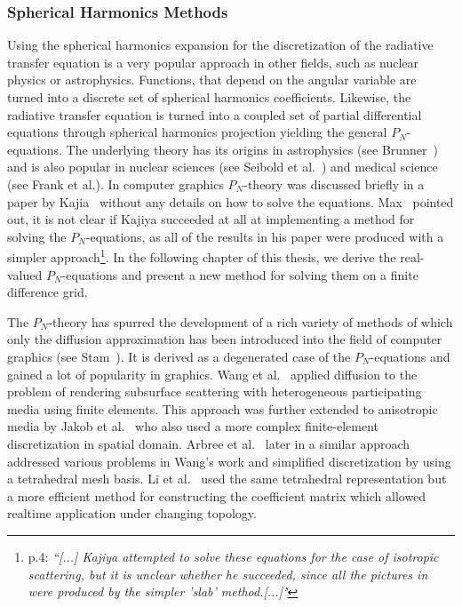 \subsubsection*{Spherical Harmonics Methods}
Using the spherical harmonics expansion for the discretization of the radiative transfer equation is a very popular approach in other fields, such as nuclear physics or astrophysics. Functions, that depend on the angular variable are turned into a discrete set of spherical harmonics coefficients. Likewise, the radiative transfer equation is turned into a coupled set of partial differential equations through spherical harmonics projection yielding the general $P_N$-equations. The underlying theory has its origins in astrophysics (see Brunner~\cite{Brunner02}) and is also popular in nuclear sciences (see Seibold et al.~\cite{Seibold14}) and medical science (see Frank et al.\cite{Frank08}). In computer graphics $P_N$-theory was discussed briefly in a paper by Kajia~\cite{Kajiya84} without any details on how to solve the equations. Max~\cite{Max95} pointed out, it is not clear if Kajiya succeeded at all at implementing a method for solving the $P_N$-equations, as all of the results in his paper were produced with a simpler approach\footnote{\cite{Max95} p.4: \emph{``[...] Kajiya attempted to solve these equations for the case of isotropic scattering, but it is unclear whether he succeeded, since all the pictures in \cite{Kajiya84} were produced by the simpler 'slab' method.[...]"}}. In the following chapter of this thesis, we derive the real-valued $P_N$-equations and present a new method for solving them on a finite difference grid. 

The $P_N$-theory has spurred the development of a rich variety of methods of which only the diffusion approximation has been introduced into the field of computer graphics (see Stam~\cite{Stam95}). It is derived as a degenerated case of the $P_N$-equations and gained a lot of popularity in graphics. Wang et al.~\cite{Wang08} applied diffusion to the problem of rendering subsurface scattering with heterogeneous participating media using finite elements. This approach was further extended to anisotropic media by Jakob et al.~\cite{Jakob10} who also used a more complex finite-element discretization in spatial domain. Arbree et al.~\cite{Arbree11} later in a similar approach addressed various problems in Wang's work and simplified discretization by using a tetrahedral mesh basis. Li et al.~\cite{Li13} used the same tetrahedral representation but a more efficient method for constructing the coefficient matrix which allowed realtime application under changing topology.

